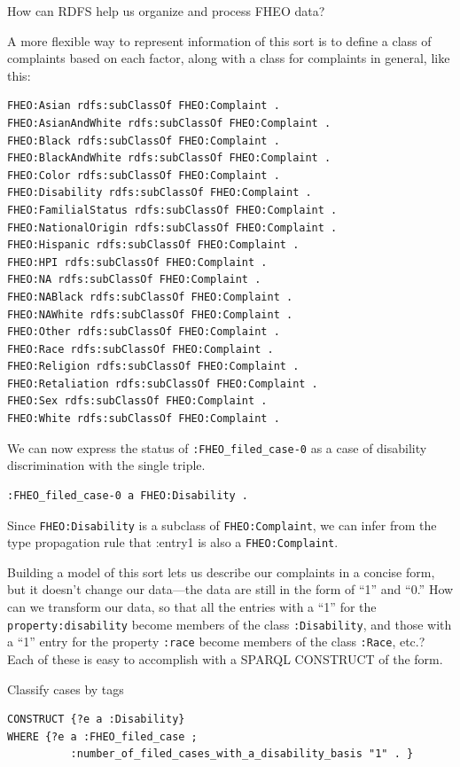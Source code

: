 \begin{challenge}{How can RDFS help us organize and process FHEO data?}

\solution

A more flexible way to represent information of this sort is to define a
class of complaints based on each factor, along with a class for
complaints in general, like this:

\begin{lstlisting}
FHEO:Asian rdfs:subClassOf FHEO:Complaint .
FHEO:AsianAndWhite rdfs:subClassOf FHEO:Complaint .
FHEO:Black rdfs:subClassOf FHEO:Complaint .
FHEO:BlackAndWhite rdfs:subClassOf FHEO:Complaint .
FHEO:Color rdfs:subClassOf FHEO:Complaint .
FHEO:Disability rdfs:subClassOf FHEO:Complaint .
FHEO:FamilialStatus rdfs:subClassOf FHEO:Complaint .
FHEO:NationalOrigin rdfs:subClassOf FHEO:Complaint .
FHEO:Hispanic rdfs:subClassOf FHEO:Complaint .
FHEO:HPI rdfs:subClassOf FHEO:Complaint .
FHEO:NA rdfs:subClassOf FHEO:Complaint .
FHEO:NABlack rdfs:subClassOf FHEO:Complaint .
FHEO:NAWhite rdfs:subClassOf FHEO:Complaint .
FHEO:Other rdfs:subClassOf FHEO:Complaint .
FHEO:Race rdfs:subClassOf FHEO:Complaint .
FHEO:Religion rdfs:subClassOf FHEO:Complaint .
FHEO:Retaliation rdfs:subClassOf FHEO:Complaint .
FHEO:Sex rdfs:subClassOf FHEO:Complaint .
FHEO:White rdfs:subClassOf FHEO:Complaint .
\end{lstlisting}

We can now express the status of \texttt{:FHEO\_filed\_case-0} as a case of disability
discrimination with the single triple.

\begin{lstlisting}
:FHEO_filed_case-0 a FHEO:Disability .
\end{lstlisting}

Since \texttt{FHEO:Disability} is a subclass of \texttt{FHEO:Complaint}, we can infer from
the type propagation rule that :entry1 is also a \texttt{FHEO:Complaint}.

Building a model of this sort lets us describe our complaints in a
concise form, but it doesn't change our data---the data are still in the
form of ``1'' and ``0.'' How can we transform our data, so that all the
entries with a ``1'' for the \texttt{property:disability} become members of the
class \texttt{:Disability}, and those with a ``1'' entry for the property \texttt{:race}
become members of the class \texttt{:Race}, etc.? Each of these is easy to
accomplish with a SPARQL CONSTRUCT of the form.

\begin{query}Classify cases by tags\end{query}
\begin{lstlisting}
CONSTRUCT {?e a :Disability}
WHERE {?e a :FHEO_filed_case ;
          :number_of_filed_cases_with_a_disability_basis "1" . }
\end{lstlisting}


\end{challenge}
